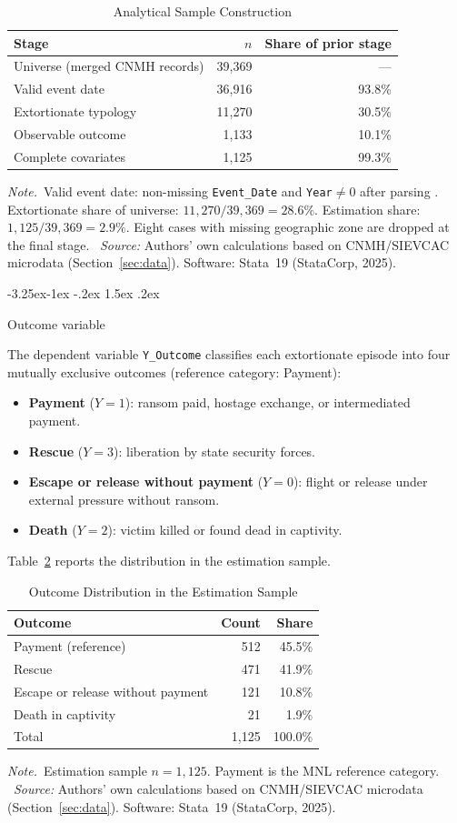 \documentclass[12pt]{article}
\makeatletter
\numberwithin{equation}{section}
\numberwithin{table}{section}
\renewcommand\subsection{\@startsection{subsection}{2}{\z@}%
                                     {-3.25ex\@plus -1ex \@minus -.2ex}%
                                     {1.5ex \@plus .2ex}%
                                     {\normalfont\large\bfseries\raggedright}}
\newcommand{\tabnote}{\par\addvspace{0.4em}\noindent\emph{Note.}}
\newcommand{\tabsource}{\ \textit{Source:} Authors' own calculations based on
CNMH/SIEVCAC microdata (Section~\ref{sec:data}). Software: Stata~19
(StataCorp, 2025).}
\makeatother
\begin{document}
\begin{table}[t]
\centering
\caption{Analytical Sample Construction}
\label{tab:sample-flow}
\begin{tabular}{@{}lrr@{}}
\toprule
Stage & $n$ & Share of prior stage \\
\midrule
Universe (merged CNMH records) & 39,369 & --- \\
Valid event date & 36,916 & 93.8\% \\
Extortionate typology & 11,270 & 30.5\% \\
Observable outcome & 1,133 & 10.1\% \\
Complete covariates & 1,125 & 99.3\% \\
\bottomrule
\end{tabular}
\tabnote\ Valid event date: non-missing \texttt{Event\_Date} and \texttt{Year}$\neq 0$
after parsing . Extortionate share of universe:
$11{,}270/39{,}369=28.6\%$. Estimation share: $1{,}125/39{,}369=2.9\%$. Eight
cases with missing geographic zone are dropped at the final stage.
\tabsource
\end{table}

\subsection{Outcome variable}

The dependent variable \texttt{Y\_Outcome} classifies each extortionate
episode into four mutually exclusive outcomes (reference category: Payment):
\begin{itemize}
\item \textbf{Payment} ($Y=1$): ransom paid, hostage exchange, or
  intermediated payment.
\item \textbf{Rescue} ($Y=3$): liberation by state security forces.
\item \textbf{Escape or release without payment} ($Y=0$):
  flight or release under external pressure without ransom.
\item \textbf{Death} ($Y=2$): victim killed or found dead in captivity.
\end{itemize}
Table~\ref{tab:outcome-dist} reports the distribution in the estimation
sample.

\begin{table}[t]
\centering
\caption{Outcome Distribution in the Estimation Sample}
\label{tab:outcome-dist}
\begin{tabular}{@{}lrr@{}}
\toprule
Outcome & Count & Share \\
\midrule
Payment (reference) & 512 & 45.5\% \\
Rescue & 471 & 41.9\% \\
Escape or release without payment & 121 & 10.8\% \\
Death in captivity & 21 & 1.9\% \\
\midrule
Total & 1,125 & 100.0\% \\
\bottomrule
\end{tabular}
\tabnote\ Estimation sample $n=1{,}125$. Payment is the MNL reference category.
\tabsource
\end{table}
\end{document}
